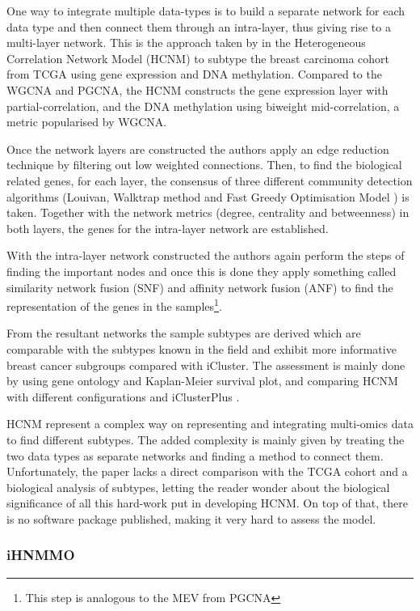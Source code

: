 One way to integrate multiple data-types is to build a separate network for each data type and then connect them through an intra-layer, thus giving rise to a multi-layer network. This is the approach taken by \citet{Vangimalla2021-fc} in the Heterogeneous Correlation Network Model (HCNM) to subtype the breast carcinoma cohort from TCGA using gene expression and DNA methylation. Compared to the WGCNA and PGCNA, the HCNM constructs the gene expression layer with partial-correlation, and the DNA methylation using biweight mid-correlation, a metric popularised by WGCNA. 

Once the network layers are constructed the authors apply an edge reduction technique by filtering out low weighted connections. Then, to find the biological related genes, for each layer, the consensus of three different community detection algorithms (Louivan\cite{Blondel2008-ik}, Walktrap method \citet{Pons2005-oa} and Fast Greedy Optimisation Model \citet{Clauset2004-em}) is taken. Together with the network metrics (degree, centrality and betweenness) in both layers, the genes for the intra-layer network are established.

With the intra-layer network constructed the authors again perform the steps of finding the important nodes and once this is done they apply something called similarity network fusion (SNF) and affinity network fusion (ANF) to find the representation of the genes in the samples\footnote{This step is analogous to the MEV from PGCNA}. 

From the resultant networks the sample subtypes are derived which are comparable with the subtypes known in the field and exhibit more informative breast cancer subgroups compared with iCluster. The assessment is mainly done by using gene ontology and Kaplan-Meier survival plot, and comparing HCNM with different configurations and iClusterPlus \citet{Mo2013-zi}. 

HCNM represent a complex way on representing and integrating multi-omics data to find different subtypes. The added complexity is mainly given by treating the two data types as separate networks and finding a method to connect them. Unfortunately, the paper lacks a direct comparison with the TCGA cohort and a biological analysis of subtypes, letting the reader wonder about the biological significance of all this hard-work put in developing HCNM. On top of that, there is no software package published, making it very hard to assess the model. 

\subsubsection{iHNMMO}

